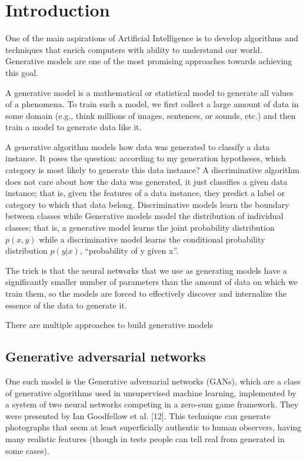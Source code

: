 \documentclass{vldb}
\begin{document}
\section{Introduction}
One of the main aspirations of Artificial Intelligence is to develop algorithms and techniques that enrich computers with ability to understand our world. Generative models are one of the most promising approaches towards achieving this goal.\par
A generative model is a mathematical or statistical model to generate all values of a phenomena. To train such a model, we first collect a large amount of data in some domain (e.g., think millions of images, sentences, or sounds, etc.) and then train a model to generate data like it.\par
A generative algorithm models how data was generated to classify a data instance. It poses the question: according to my generation hypotheses, which category is most likely to generate this data instance? A discriminative algorithm does not care about how the data was generated, it just classifies a given data instance; that is, given the features of a data instance, they predict a label or category to which that data belong. Discriminative models learn the boundary between classes while Generative models model the distribution of individual classes; that is, a generative model learns the joint probability distribution $p(x,y)$ while a discriminative model learns the conditional probability distribution $p(y|x)$, “probability of y given x”.\par
The trick is that the neural networks that we use as generating models have a significantly smaller number of parameters than the amount of data on which we train them, so the models are forced to effectively discover and internalize the essence of the data to generate it.\par
\noindent There are multiple approaches to build generative models 

\subsection{Generative adversarial networks}
One such model is the Generative adversarial networks (GANs), which are a class of generative algorithms used
in unsupervised machine learning, implemented by a system of two neural networks
competing in a zero-sum game framework. They were presented by Ian Goodfellow
et al. [12]. This technique can generate photographs that seem at least superficially
authentic to human observers, having many realistic features (though in tests people
can tell real from generated in some cases).
\end{document}
